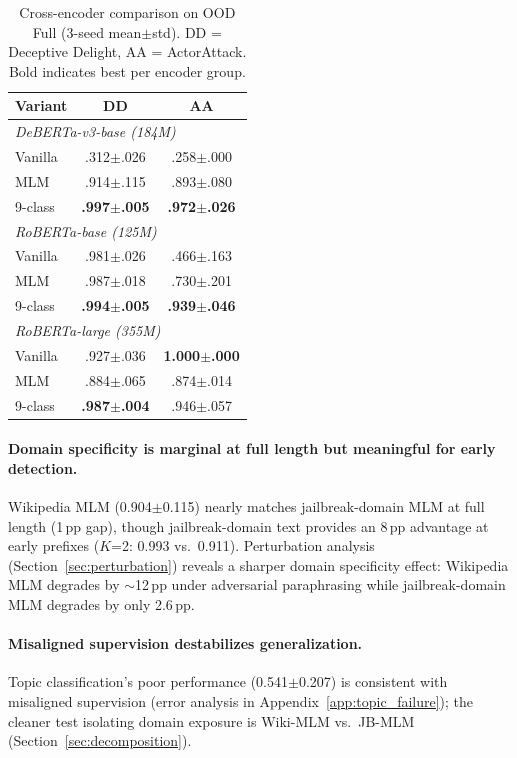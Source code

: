 \begin{table}[t]
\centering
\footnotesize
\caption{Cross-encoder comparison on OOD Full (3-seed mean$\pm$std). DD = Deceptive Delight, AA = ActorAttack. Bold indicates best per encoder group.}
\label{tab:cross_encoder}
\begin{tabular}{@{}lcc@{}}
\toprule
\textbf{Variant} & DD & AA \\
\midrule
\multicolumn{3}{l}{\textit{DeBERTa-v3-base (184M)}} \\[2pt]
Vanilla & .312$\pm$.026 & .258$\pm$.000 \\
MLM & .914$\pm$.115 & .893$\pm$.080 \\
9-class & \textbf{.997$\pm$.005} & \textbf{.972$\pm$.026} \\
\midrule
\multicolumn{3}{l}{\textit{RoBERTa-base (125M)}} \\[2pt]
Vanilla & .981$\pm$.026 & .466$\pm$.163 \\
MLM & .987$\pm$.018 & .730$\pm$.201 \\
9-class & \textbf{.994$\pm$.005} & \textbf{.939$\pm$.046} \\
\midrule
\multicolumn{3}{l}{\textit{RoBERTa-large (355M)}} \\[2pt]
Vanilla & .927$\pm$.036 & \textbf{1.000$\pm$.000} \\
MLM & .884$\pm$.065 & .874$\pm$.014 \\
9-class & \textbf{.987$\pm$.004} & .946$\pm$.057 \\
\bottomrule
\end{tabular}
\end{table}

\paragraph{Domain specificity is marginal at full length but meaningful for early detection.}
Wikipedia MLM (0.904$\pm$0.115) nearly matches jailbreak-domain MLM at full length (1\,pp gap), though jailbreak-domain text provides an 8\,pp advantage at early prefixes ($K$=2: 0.993 vs.\ 0.911).
Perturbation analysis (Section~\ref{sec:perturbation}) reveals a sharper domain specificity effect: Wikipedia MLM degrades by $\sim$12\,pp under adversarial paraphrasing while jailbreak-domain MLM degrades by only 2.6\,pp.

\paragraph{Misaligned supervision destabilizes generalization.}
Topic classification's poor performance (0.541$\pm$0.207) is consistent with misaligned supervision (error analysis in Appendix~\ref{app:topic_failure}); the cleaner test isolating domain exposure is Wiki-MLM vs.\ JB-MLM (Section~\ref{sec:decomposition}).

